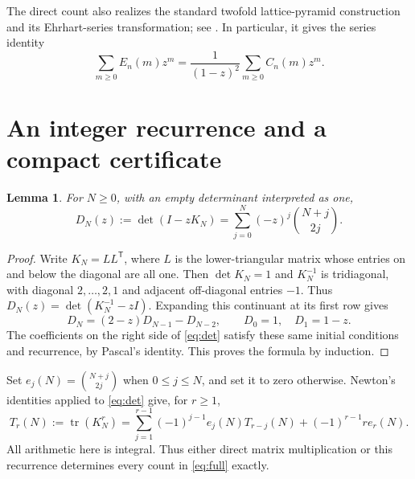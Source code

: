 \documentclass[11pt,letterpaper]{article}
\newtheorem{lemma}[theorem]{Lemma}
\newcommand{\tr}{\operatorname{tr}}
\begin{document}
The direct count also realizes the standard twofold lattice-pyramid construction and its Ehrhart-series transformation; see \cite[arXiv v5, Proposition~6.1 and Theorem~6.6]{LSML}. In particular, it gives the series identity
\begin{equation}\label{eq:series}
 \sum_{m\geq0}E_n(m)z^m=\frac{1}{(1-z)^2}\sum_{m\geq0}C_n(m)z^m.
\end{equation}

\section{An integer recurrence and a compact certificate}
\begin{lemma}\label{lem:det}
For $N\geq0$, with an empty determinant interpreted as one,
\begin{equation}\label{eq:det}
 D_N(z):=\det(I-zK_N)=\sum_{j=0}^N(-z)^j\binom{N+j}{2j}.
\end{equation}
\end{lemma}
\begin{proof}
Write $K_N=LL^{\mathsf T}$, where $L$ is the lower-triangular matrix whose entries on and below the diagonal are all one. Then $\det K_N=1$ and $K_N^{-1}$ is tridiagonal, with diagonal $2,\ldots,2,1$ and adjacent off-diagonal entries $-1$. Thus $D_N(z)=\det(K_N^{-1}-zI)$. Expanding this continuant at its first row gives
\[
 D_N=(2-z)D_{N-1}-D_{N-2},\qquad D_0=1,\quad D_1=1-z.
\]
The coefficients on the right side of \eqref{eq:det} satisfy these same initial conditions and recurrence, by Pascal's identity. This proves the formula by induction.
\end{proof}

Set $e_j(N)=\binom{N+j}{2j}$ when $0\leq j\leq N$, and set it to zero otherwise. Newton's identities applied to \eqref{eq:det} give, for $r\geq1$,
\begin{equation}\label{eq:newton}
 T_r(N):=\tr(K_N^r)=\sum_{j=1}^{r-1}(-1)^{j-1}e_j(N)T_{r-j}(N)
 +(-1)^{r-1}r e_r(N).
\end{equation}
All arithmetic here is integral. Thus either direct matrix multiplication or this recurrence determines every count in \eqref{eq:full} exactly.
\end{document}

